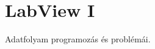 \documentclass[../../main.tex]{subfiles}
\begin{document}
\section{LabView I}

\begin{fulltheorem}
	Adatfolyam programozás és problémái.
\end{fulltheorem}
\end{document}
